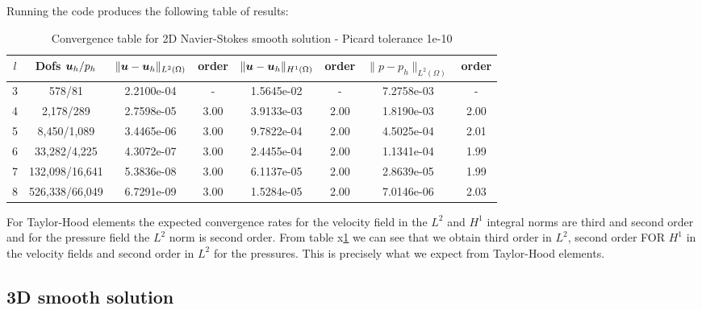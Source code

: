 Running the \fenics code produces the following table of results:
\begin{table}[h!] \small
\begin{center}
\begin{tabular}{cccccccc}
\hline
$l$ &    Dofs $\boldsymbol u_h/p_h$ & $\|\boldsymbol u-\boldsymbol u_h\|_{L^2(\Omega)}$ & order & $\|\boldsymbol u-\boldsymbol u_h\|_{H^1(\Omega)}$ & order &        $\|{p}-{p}_h\|_{L^2(\Omega)}$ & order \\
\hline
 3 &     578/81 &  2.2100e-04 &     - &  1.5645e-02 &     - &  7.2758e-03 &      - \\
 4 &    2,178/289 &  2.7598e-05 &     3.00 &  3.9133e-03 &     2.00 &  1.8190e-03 &      2.00 \\
 5 &    8,450/1,089 &  3.4465e-06 &     3.00 &  9.7822e-04 &     2.00 &  4.5025e-04 &      2.01 \\
 6 &   33,282/4,225 &  4.3072e-07 &     3.00 &  2.4455e-04 &     2.00 &  1.1341e-04 &      1.99 \\
 7 &  132,098/16,641 &  5.3836e-08 &     3.00 &  6.1137e-05 &     2.00 &  2.8639e-05 &      1.99 \\
 8 &  526,338/66,049 &  6.7291e-09 &     3.00 &  1.5284e-05 &     2.00 &  7.0146e-06 &      2.03 \\
\hline
\end{tabular}
\caption{Convergence table for 2D Navier-Stokes smooth solution - Picard tolerance 1e-10}
\label{tab:NS_2D_smooth}
\end{center}
\end{table}

\noindent For Taylor-Hood elements the expected convergence rates for the velocity field in the $L^2$ and $H^1$ integral norms are third and second order and for the pressure field the $L^2$ norm is second order. From table x\ref{tab:NS_2D_smooth} we can see that we obtain third order in $L^2$, second order FOR $H^1$ in the velocity fields and second order in $L^2$ for the pressures. This is precisely what we expect from Taylor-Hood elements.

\subsection{3D smooth solution}

